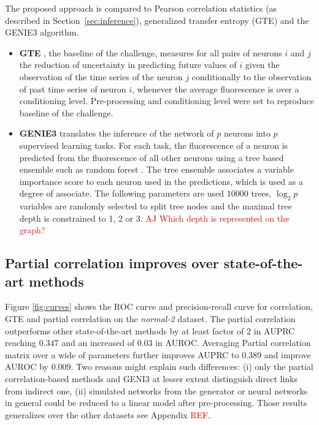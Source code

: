 \documentclass[wcp]{jmlr}
\begin{document}
The proposed approach is compared to Pearson correlation statistics (as
described in Section~\ref{sec:inference}), generalized transfer entropy (GTE)
and the GENIE3 algorithm.
\begin{itemize}
\item \textbf{GTE} \citep{stetter2012model}, the baseline of the challenge,
measures for all pairs of neurons $i$ and $j$ the reduction of uncertainty in
predicting future values of $i$ given the observation of the time series of the
neuron $j$ conditionally to the observation of past time series of neuron $i$,
whenever the average fluorescence is over a conditioning level. Pre-processing
and conditioning level were set to reproduce baseline of the challenge.

\item \textbf{GENIE3} \citep{huynhthu2010inferring} translates the inference
of the network of $p$ neurons into $p$ supervised learning tasks. For each
task, the fluorescence of a neuron is predicted from the fluorescence of all
other neurons using a tree based ensemble such as random forest
\citep{breiman2001random}. The tree ensemble associates a variable importance
score \citep{louppe2013understanding} to each neuron used in the predictions,
which is used as a degree of associate. The following parameters are used
$10000$ trees, $\log_2{p}$ variables are randomly selected to split tree nodes
and the maximal tree depth is constrained to 1, 2 or 3. \textcolor{red}{AJ Which
depth is represented on the graph?}
\end{itemize}

\subsection*{Partial correlation improves over state-of-the-art methods}

Figure \ref{fig:curves} shows the ROC curve  and precision-recall curve
for correlation, GTE and partial correlation on the \textit{normal-2}
dataset. The partial correlation outperforms other state-of-the-art methods
by at least factor of 2 in AUPRC reaching $0.347$ and an increased of $0.03$ in
AUROC. Averaging Partial correlation matrix over a wide of parameters
further improves AUPRC to $0.389$ and improve AUROC by $0.009$.
Two reasons might explain such differences: (i) only the partial
correlation-based methods and GENI3 at lesser extent distinguish
direct links from indirect one, (ii) simulated networks from the
\citep{stetter2012model} generator or neural networks in general could be
reduced to a linear model after pre-processing. Those results
generalizes over the other datasets see Appendix \textcolor{red}{REF}.
\end{document}
